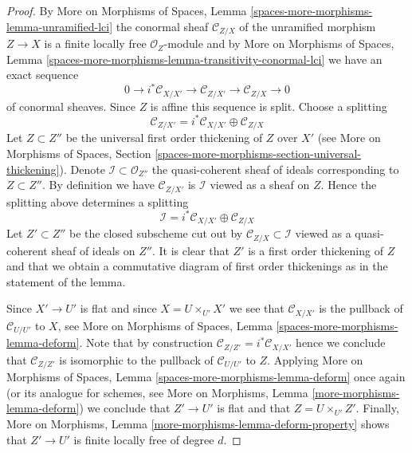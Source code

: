 \documentclass{stacks-project}
\theoremstyle{plain}
\theoremstyle{definition}
\theoremstyle{remark}
\numberwithin{equation}{subsection}
\begin{document}
\begin{proof}
By
More on Morphisms of Spaces,
Lemma \ref{spaces-more-morphisms-lemma-unramified-lci}
the conormal sheaf $\mathcal{C}_{Z/X}$ of the unramified morphism $Z \to X$
is a finite locally free $\mathcal{O}_Z$-module and by
More on Morphisms of Spaces,
Lemma \ref{spaces-more-morphisms-lemma-transitivity-conormal-lci}
we have an exact sequence
$$
0 \to i^*\mathcal{C}_{X/X'} \to
\mathcal{C}_{Z/X'} \to
\mathcal{C}_{Z/X} \to 0
$$
of conormal sheaves. Since $Z$ is affine this sequence is split. Choose
a splitting
$$
\mathcal{C}_{Z/X'} = i^*\mathcal{C}_{X/X'} \oplus \mathcal{C}_{Z/X}
$$
Let $Z \subset Z''$ be the universal first order thickening of $Z$
over $X'$ (see
More on Morphisms of Spaces,
Section \ref{spaces-more-morphisms-section-universal-thickening}).
Denote $\mathcal{I} \subset \mathcal{O}_{Z''}$ the quasi-coherent sheaf
of ideals corresponding to $Z \subset Z''$. By definition we have
$\mathcal{C}_{Z/X'}$ is $\mathcal{I}$ viewed as a sheaf on $Z$.
Hence the splitting above determines a splitting
$$
\mathcal{I} = i^*\mathcal{C}_{X/X'} \oplus \mathcal{C}_{Z/X}
$$
Let $Z' \subset Z''$ be the closed subscheme cut out by
$\mathcal{C}_{Z/X} \subset \mathcal{I}$ viewed as a quasi-coherent sheaf
of ideals on $Z''$. It is clear that $Z'$ is a first order thickening
of $Z$ and that we obtain a commutative diagram of first order thickenings
as in the statement of the lemma.

\medskip\noindent
Since $X' \to U'$ is flat and since $X = U \times_{U'} X'$ we see that
$\mathcal{C}_{X/X'}$ is the pullback of $\mathcal{C}_{U/U'}$ to $X$, see
More on Morphisms of Spaces, Lemma \ref{spaces-more-morphisms-lemma-deform}.
Note that by construction $\mathcal{C}_{Z/Z'} = i^*\mathcal{C}_{X/X'}$
hence we conclude that $\mathcal{C}_{Z/Z'}$ is isomorphic to the pullback
of $\mathcal{C}_{U/U'}$ to $Z$. Applying
More on Morphisms of Spaces, Lemma \ref{spaces-more-morphisms-lemma-deform}
once again (or its analogue for schemes, see
More on Morphisms, Lemma \ref{more-morphisms-lemma-deform})
we conclude that $Z' \to U'$ is flat and that $Z = U \times_{U'} Z'$.
Finally,
More on Morphisms, Lemma \ref{more-morphisms-lemma-deform-property}
shows that $Z' \to U'$ is finite locally free of degree $d$.
\end{proof}
\end{document}
